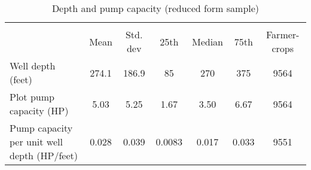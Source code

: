 \begin{table}[htbp]\centering
\def\sym#1{\ifmmode^{#1}\else\(^{#1}\)\fi}
\caption{Depth and pump capacity (reduced form sample)}
\begin{tabular}{l*{1}{cccccc}}
\toprule
                    &\multicolumn{6}{c}{}                                                         \\
                    &        Mean&    Std. dev&        25th&      Median&        75th&Farmer-crops\\
\midrule
Well depth (feet)   &       274.1&       186.9&          85&         270&         375&        9564\\
Plot pump capacity (HP)&        5.03&        5.25&        1.67&        3.50&        6.67&        9564\\
Pump capacity per unit well depth (HP/feet)&       0.028&       0.039&      0.0083&       0.017&       0.033&        9551\\
\bottomrule
\end{tabular}
\end{table}
